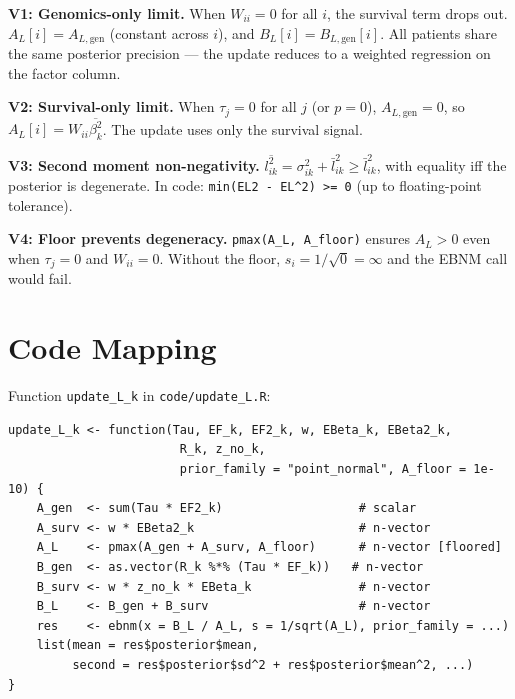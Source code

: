 \documentclass[11pt]{article}
\newcommand{\betasec}[1]{\overline{\beta^2_{#1}}}
\begin{document}
\begin{verifybox}
\textbf{V1: Genomics-only limit.}
When $W_{ii} = 0$ for all $i$, the survival term drops out.
$A_L[i] = A_{L,\text{gen}}$ (constant across $i$), and $B_L[i] = B_{L,\text{gen}}[i]$.
All patients share the same posterior precision — the update reduces to a
weighted regression on the factor column.

\textbf{V2: Survival-only limit.}
When $\tau_j = 0$ for all $j$ (or $p=0$),
$A_{L,\text{gen}} = 0$, so $A_L[i] = W_{ii}\betasec{k}$.
The update uses only the survival signal.

\textbf{V3: Second moment non-negativity.}
$\overline{l^2_{ik}} = \sigma_{ik}^2 + \bar{l}_{ik}^2 \geq \bar{l}_{ik}^2$,
with equality iff the posterior is degenerate.
In code: \texttt{min(EL2 - EL\^{}2) >= 0} (up to floating-point tolerance).

\textbf{V4: Floor prevents degeneracy.}
\texttt{pmax(A\_L, A\_floor)} ensures $A_L > 0$ even when $\tau_j = 0$ and
$W_{ii} = 0$.  Without the floor, $s_i = 1/\sqrt{0} = \infty$ and the EBNM
call would fail.
\end{verifybox}

\section{Code Mapping}\label{sec:code}

\begin{codebox}
Function \texttt{update\_L\_k} in \texttt{code/update\_L.R}:
\begin{verbatim}
update_L_k <- function(Tau, EF_k, EF2_k, w, EBeta_k, EBeta2_k,
                        R_k, z_no_k,
                        prior_family = "point_normal", A_floor = 1e-10) {
    A_gen  <- sum(Tau * EF2_k)                   # scalar
    A_surv <- w * EBeta2_k                       # n-vector
    A_L    <- pmax(A_gen + A_surv, A_floor)      # n-vector [floored]
    B_gen  <- as.vector(R_k %*% (Tau * EF_k))   # n-vector
    B_surv <- w * z_no_k * EBeta_k               # n-vector
    B_L    <- B_gen + B_surv                     # n-vector
    res    <- ebnm(x = B_L / A_L, s = 1/sqrt(A_L), prior_family = ...)
    list(mean = res$posterior$mean,
         second = res$posterior$sd^2 + res$posterior$mean^2, ...)
}
\end{verbatim}
\end{codebox}
\end{document}
